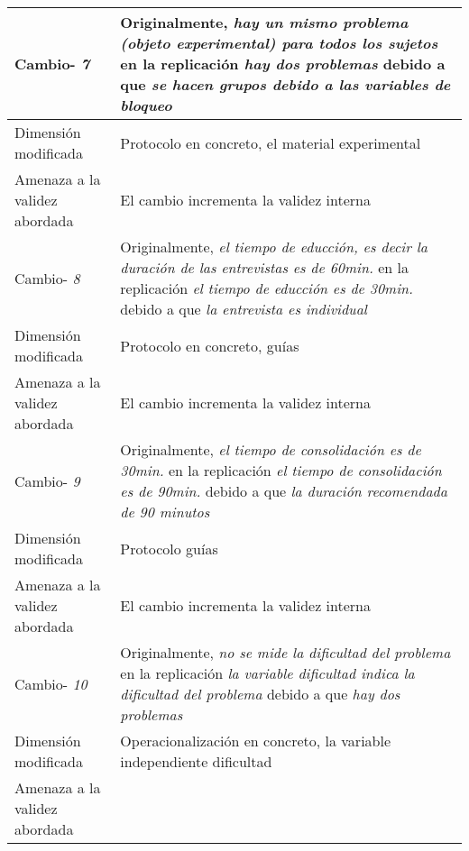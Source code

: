 
\begin{table}
\begin{tabular}{| p{3.3cm} | p{9cm} |}
\hline

 
Cambio- \textit{7}   & \parbox[t]{9cm} {Originalmente,  \textit{hay un mismo problema (objeto experimental) para todos los sujetos }} \parbox[t]{9cm}{en la replicación \textit{hay dos problemas} }  debido a que \textit{ se hacen grupos debido a las variables de bloqueo } \\  \hline
Dimensión modificada & 
Protocolo en concreto, el material experimental  \\  \hline 
Amenaza a la validez abordada  & El cambio incrementa la validez interna  \\  \hline
 \hline 
 
 Cambio- \textit{8}   & \parbox[t]{9cm} {Originalmente,  \textit{el tiempo de educción, es decir la duración de las entrevistas es de 60min.} } \parbox[t]{9cm}{en la replicación \textit{el tiempo de educción es de 30min.} } debido a que \textit{la entrevista es individual } \\  \hline
Dimensión modificada & 
 Protocolo en concreto, guías    \\  \hline 
Amenaza a la validez abordada  & El cambio incrementa la validez  interna  \\  \hline \hline

Cambio- \textit{9}   & \parbox[t]{9cm} {Originalmente,  \textit{el tiempo de consolidación es de 30min.} } \parbox[t]{9cm}{en la replicación \textit{el tiempo de consolidación es de 90min. } } debido a que \textit{la duración recomendada de 90 minutos} \\  \hline
Dimensión modificada & 
Protocolo guías     \\  \hline 
Amenaza a la validez abordada  & El cambio incrementa la validez  interna  \\  \hline \hline

Cambio- \textit{10}   & \parbox[t]{9cm} {Originalmente,  \textit{no se mide la dificultad del problema} } \parbox[t]{9cm}{en la replicación \textit{la variable dificultad indica la dificultad del problema } } debido a que \textit{hay dos problemas} \\  \hline
Dimensión modificada & 
 Operacionalización en concreto,  la variable independiente dificultad  \\  \hline 
Amenaza a la validez abordada  &   \\  \hline

\end{tabular}
\label{tab:plantilla}
\end{table}






